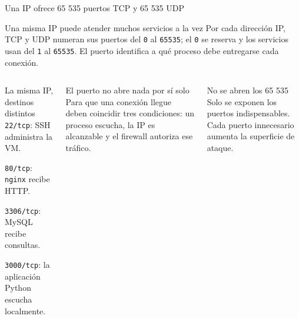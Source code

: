 \documentclass[aspectratio=169,10pt,c]{beamer}
\begin{document}
\begin{frame}{Una IP ofrece 65 535 puertos TCP y 65 535 UDP}
\begin{block}{Una misma IP puede atender muchos servicios a la vez}
\small Por cada dirección IP, TCP y UDP numeran sus puertos del \texttt{0} al \texttt{65535}; el \texttt{0} se reserva y los servicios usan del \texttt{1} al \texttt{65535}. El puerto identifica a qué proceso debe entregarse cada conexión.
\end{block}
\begin{columns}[T,onlytextwidth]
\begin{exampleblock}{La misma IP, destinos distintos}
\small
\texttt{22/tcp}: SSH administra la VM.\par\smallskip
\texttt{80/tcp}: \texttt{nginx} recibe HTTP.\par\smallskip
\texttt{3306/tcp}: MySQL recibe consultas.\par\smallskip
\texttt{3000/tcp}: la aplicación Python escucha localmente.
\end{exampleblock}
\begin{exampleblock}{El puerto no abre nada por sí solo}
\small Para que una conexión llegue deben coincidir tres condiciones: un proceso escucha, la IP es alcanzable y el firewall autoriza ese tráfico.
\end{exampleblock}
\begin{alertblock}{No se abren los 65 535}
\small Solo se exponen los puertos indispensables. Cada puerto innecesario aumenta la superficie de ataque.
\end{alertblock}
\end{columns}
\end{frame}
\end{document}
